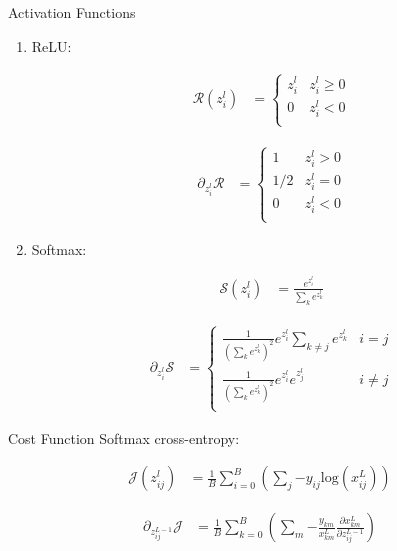 \documentclass[12pt]{article} %
\begin{document}
\begin{section}{Activation Functions}
\begin{enumerate}
\item
ReLU:

\begin{align}
\mathcal{R}(z^{l}_{i}) &= \left\{\begin{array}{ll} 
      z^{l}_{i} & z^{l}_{i}\geq 0 \\
      0 & z^{l}_{i} < 0 \\
   \end{array}\right.
\end{align}

\begin{align}
\partial_{z^{l}_{i}}\mathcal{R} &= \left\{\begin{array}{ll} 
      1 & z^{l}_{i} > 0 \\
      1/2 & z^{l}_{i} = 0 \\
      0 & z^{l}_{i} < 0 \\
   \end{array}\right.
\end{align}

\item
Softmax:

\begin{align}
\mathcal{S}(z^{l}_{i}) &= \frac{e^{z^{l}_{i}}}{\sum\limits_{k}{e^{z^{l}_{k}}}}
\end{align}

\begin{align}
\partial_{z^{l}_{i}}\mathcal{S} &= \left\{\begin{array}{ll} 
      \frac{1}{\left(\sum\limits_{k}{e^{z^{l}_{k}}}\right)^{2}}e^{z^{l}_{i}}\sum\limits_{k\neq j}{e^{z^{l}_{k}}} & i = j \\
      \frac{1}{\left(\sum\limits_{k}{e^{z^{l}_{k}}}\right)^{2}}e^{z^{l}_{i}}e^{z^{l}_{j}} & i \neq j \\
   \end{array}\right.
\end{align}
\end{enumerate}
\end{section}

\begin{section}{Cost Function}
Softmax cross-entropy:

\begin{align}
\mathcal{J}(z^{l}_{ij}) &= \frac{1}{B} \sum\limits_{i=0}^{B}{\left(\sum\limits_{j}{-y_{ij} \text{log}(x^{L}_{ij})}\right)}
\end{align}

\begin{align}
\partial_{z^{L-1}_{ij}}\mathcal{J} &= \frac{1}{B} \sum\limits_{k=0}^{B}{\left(\sum\limits_{m}{-\frac{y_{km}}{x^{L}_{km}}\frac{\partial x^{L}_{km}}{\partial z^{L-1}_{ij}}}\right)}
\end{align}
\end{section}
\end{document}
